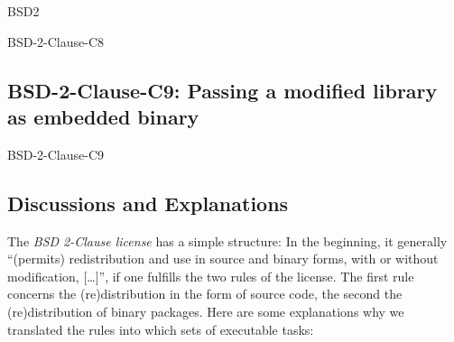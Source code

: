 \begin{license}{BSD2}
\begin{lsuc}{BSD-2-Clause-C8}
  \lsucprohibitsnothing
\end{lsuc}

\subsection{BSD-2-Clause-C9: Passing a modified library as embedded binary}
\begin{lsuc}{BSD-2-Clause-C9}

  \lsucmeans{\useCaseNine}
  \lsuccovers{\coversNine}

  \begin{lsucrequires}
    \lsucmandatory{\insertLicenseIntoBinary}\passingFilesCorrectly
    \lsucoptional{\addLibraryLicenseToCopyrightMessage}
    \lsucoptional{\keepBinariesSeparate}
  \end{lsucrequires}

  \lsucprohibitsnothing
\end{lsuc}

\end{license}


\subsection{Discussions and Explanations}
\label{BSD2Discussion}%
\label{BSD3Discussion}

The \textit{BSD 2-Clause license} has a simple structure: In the
beginning, it generally \enquote{(permits) redistribution and use in
source and binary forms, with or without modification, [\ldots]}, if one
fulfills the two rules of the license.\citeBSDsimple
The first rule concerns the (re)distribution in the form of source code, 
the second the (re)distribution of binary packages. Here are some
explanations why we translated the rules into which sets of executable tasks:

